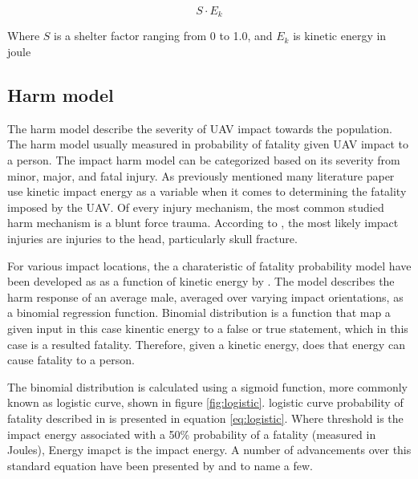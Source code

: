 \documentclass[12pt]{report}
\begin{document}
            \begin{equation}\label{eq:shelter_factor}
                S \cdot E_k
            \end{equation}

            Where \(S\) is a shelter factor ranging from 0 to 1.0, and \(E_k\) is kinetic energy in joule
            
        \subsection{Harm model}
            The harm model describe the severity of UAV impact towards the population. The harm model usually measured
            in probability of fatality given UAV impact to a person. The impact harm model can be categorized based on
            its severity from minor, major, and fatal injury. As previously mentioned many literature paper use kinetic
            impact energy as a variable when it comes to determining the fatality imposed by the UAV.  Of every injury
            mechanism, the most common studied harm mechanism is a blunt force trauma. According to
            \cite{shelley_model_2016}, the most likely impact injuries are injuries to the head, particularly skull
            fracture. 

            For various impact locations, the a charateristic of fatality probability model have been developed as as a
            function of kinetic energy by \cite{harwick_approved_2007}. The model describes the harm response of an
            average male, averaged over varying impact orientations, as a binomial regression function. Binomial
            distribution is a function that map a given input in this case kinentic energy to a false or true statement,
            which in this case is a resulted fatality. Therefore, given a kinetic energy, does that energy can cause
            fatality to a person. 
            
            The binomial distribution is calculated using a sigmoid function, more commonly known as logistic curve,
            shown in figure \ref{fig:logistic}. logistic curve probability of fatality described in
            \cite{shelley_model_2016} is presented in equation \ref{eq:logistic}. Where threshold is the impact energy
            associated with a 50\% probability of a fatality (measured in Joules), Energy imapct is the impact energy. A
            number of advancements over this standard equation have been presented by
            \cite{dalamagkidis_evaluating_2008} and \cite{shelley_model_2016} to name a few.
\end{document}
